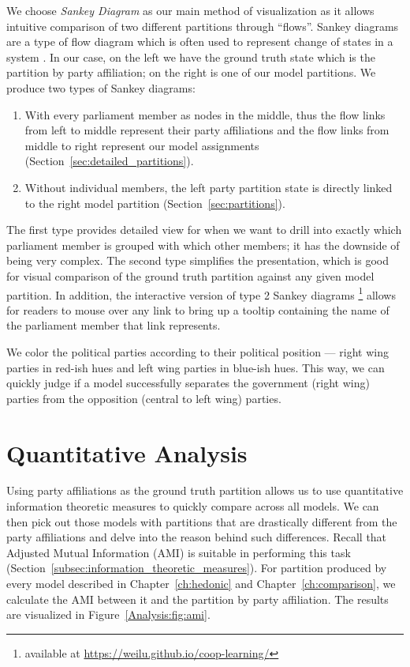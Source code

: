 We choose \textit{Sankey Diagram} as our main method of visualization as it
allows intuitive comparison of two different partitions through ``flows''.
Sankey diagrams are a type of flow diagram which is often used to represent
change of states in a system \cite{doi:10.1111/j.1530-9290.2008.00004.x}.
In our case, on the left we have the ground truth state which is the partition
by party affiliation; on the right is one of our model partitions.
We produce two types of Sankey diagrams:

\begin{enumerate}
  \item With every parliament member as nodes in the middle, thus the flow links
    from left to middle represent their party affiliations and the flow links
    from middle to right represent our model assignments
    (Section~\ref{sec:detailed_partitions}).
  \item Without individual members, the left party partition state is directly
    linked to the right model partition (Section~\ref{sec:partitions}).
\end{enumerate}

The first type provides detailed view for when we want to drill into exactly
which parliament member is grouped with which other members; it has the
downside of being very complex.
The second type simplifies the presentation, which is good for visual comparison
of the ground truth partition against any given model partition.
In addition, the interactive version of type 2 Sankey diagrams
\footnote{available at \url{https://weilu.github.io/coop-learning/}} allows
for readers to mouse over any link to bring up a tooltip containing the name
of the parliament member that link represents.

We color the political parties according to their political position ---
right wing parties in red-ish hues and left wing parties in blue-ish hues.
This way, we can quickly judge if a model successfully separates the government
(right wing) parties from the opposition (central to left wing) parties.


\section{Quantitative Analysis}
\label{sec:quantitative_analysis}

Using party affiliations as the ground truth partition allows us to use
quantitative information theoretic measures to quickly compare across all
models.
We can then pick out those models with partitions that are drastically
different from the party affiliations and delve into the reason behind such
differences.
Recall that Adjusted Mutual Information (AMI) is suitable in performing
this task (Section~\ref{subsec:information_theoretic_measures}).
For partition produced by every model described in Chapter~\ref{ch:hedonic} and
Chapter~\ref{ch:comparison}, we calculate the AMI between it and the partition
by party affiliation.
The results are visualized in Figure~\ref{Analysis:fig:ami}.

